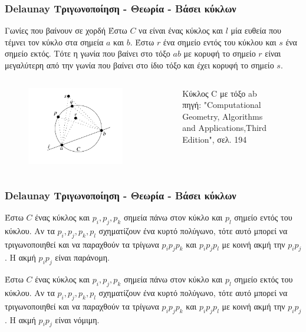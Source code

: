 \documentclass[xcolor=dvipsnames, 11pt]{beamer}
\newcommand{\en}{\selectlanguage{english}}
\newcommand{\el}{\selectlanguage{greek}}
\begin{document}
\begin{frame}
	\frametitle{\en Delaunay \el Τριγωνοποίηση - Θεωρία - Βάσει κύκλων}
	\begin{mytheorem}{Γωνίες που βαίνουν σε χορδή}{}
		Έστω \(C\) να είναι ένας κύκλος και \(l\) μία ευθεία που τέμνει τον κύκλο στα σημεία \(a\) και \(b\). Έστω \(r\) ένα σημείο εντός του κύκλου και \(s\) ένα σημείο εκτός. Τότε η γωνία που βαίνει στο τόξο \(ab\) με κορυφή το σημείο \(r\) είναι μεγαλύτερη από την γωνία που βαίνει στο ίδιο τόξο και έχει κορυφή το σημείο \(s\). 
	\end{mytheorem}
	\begin{columns}
		\begin{figure}
			\includegraphics[scale=0.25]{images/circle.png}
		\end{figure}
		\begin{figure}
			\caption{Κύκλος C με τόξο ab \\ πηγή: "Computational Geometry, Algorithms and Applications,Third Edition", σελ. 194}
		\end{figure}
	\end{columns}
\end{frame}

\begin{frame}
	\frametitle{\en Delaunay \el Τριγωνοποίηση - Θεωρία - Βάσει κύκλων}
	\begin{mylemma}{}{}
		Έστω \(C\) ένας κύκλος και \(p_i, p_j, p_k\) σημεία πάνω στον κύκλο και \(p_l\) σημείο εντός του κύκλου. Αν τα \(p_i, p_j, p_k, p_l\) σχηματίζουν ένα κυρτό πολύγωνο, τότε αυτό μπορεί να τριγωνοποιηθεί και να παραχθούν τα τρίγωνα \(p_i p_j p_k\) και \(p_i p_j p_l\) με κοινή ακμή την \(p_i p_j\). Η ακμή \(p_i p_j\) είναι παράνομη.
	\end{mylemma} 	
	\begin{mylemma}{}{}
		Έστω \(C\) ένας κύκλος και \(p_i, p_j, p_k\) σημεία πάνω στον κύκλο και \(p_l\) σημείο εκτός του κύκλου. Αν τα \(p_i, p_j, p_k, p_l\) σχηματίζουν ένα κυρτό πολύγωνο, τότε αυτό μπορεί να τριγωνοποιηθεί και να παραχθούν τα τρίγωνα \(p_i p_j p_k\) και \(p_i p_j p_l\) με κοινή ακμή την \(p_i p_j\). Η ακμή \(p_i p_j\) είναι νόμιμη.
	\end{mylemma} 
\end{frame}
\end{document}
